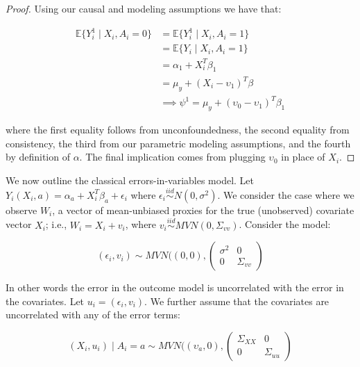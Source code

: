 \begin{proof}

Using our causal and modeling assumptions we have that:

\begin{align*}
\mathbb{E}\{Y_i^1 \mid X_i, A_i = 0\} &= \mathbb{E}\{Y_i^1 \mid X_i, A_i = 1\} \\
&= \mathbb{E}\{Y_i \mid X_i, A_i = 1\} \\
&= \alpha_1 + X_i^T\beta_1 \\
&= \mu_y + (X_i - \upsilon_1)^T\beta \\
&\implies \psi^1 = \mu_y + (\upsilon_0 - \upsilon_1)^T\beta_1
\end{align*}

where the first equality follows from unconfoundedness, the second equality from consistency, the third from our parametric modeling assumptions, and the fourth by definition of $\alpha$. The final implication comes from plugging $\upsilon_0$ in place of $X_i$.

\end{proof}

We now outline the classical errors-in-variables model. Let $Y_i(X_i, a) = \alpha_a + X_i^T\beta_a + \epsilon_i$ where $\epsilon_i \stackrel{iid}\sim N(0, \sigma^2)$. We consider the case where we observe $W_i$, a vector of mean-unbiased proxies for the true (unobserved) covariate vector $X_i$; i.e., $W_i = X_i + v_i$, where $v_i \stackrel{iid}\sim MVN(0, \Sigma_{vv})$. Consider the model:

\begin{equation}
(\epsilon_i, v_i) \sim MVN((0, 0), \begin{pmatrix} 
\sigma^2 & 0 \\ 
0 & \Sigma_{vv}  
\end{pmatrix}
\end{equation}

In other words the error in the outcome model is uncorrelated with the error in the covariates. Let $u_i = (\epsilon_i, v_i)$. We further assume that the covariates are uncorrelated with any of the error terms:

\begin{equation}
(X_i, u_i) \mid A_i = a \sim MVN((\upsilon_a, 0), \begin{pmatrix} 
\Sigma_{XX} & 0 \\ 
0 & \Sigma_{uu}  
\end{pmatrix}
\end{equation}

